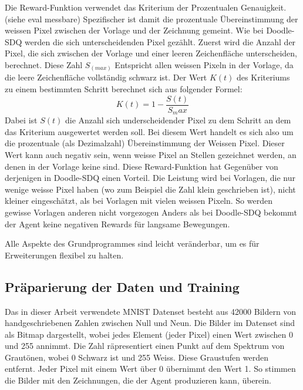 Die Reward-Funktion verwendet das Kriterium der Prozentualen Genauigkeit. (siehe eval messbare)
Spezifischer ist damit die prozentuale Übereinstimmung der weissen Pixel zwischen der Vorlage und der Zeichnung
gemeint. Wie bei Doodle-SDQ werden die sich unterscheidenden Pixel
gezählt. Zuerst wird die Anzahl der Pixel, die sich zwischen der Vorlage und
einer leeren Zeichenfläche unterscheiden, berechnet. Diese Zahl $S_(max)$
Entspricht allen weissen Pixeln in der Vorlage, da die leere Zeichenfläche
vollständig schwarz ist. Der Wert $K(t)$ des Kriteriums zu einem bestimmten
Schritt berechnet sich aus folgender Formel: 
$$ K(t) = 1 - \frac{S(t)}{S_max} $$ Dabei ist $S(t)$ die Anzahl sich
underscheidender Pixel zu dem Schritt an dem das Kriterium ausgewertet werden
soll. Bei diesem Wert handelt es sich also um die prozentuale (als Dezimalzahl)
Übereinstimmung der Weissen Pixel. Dieser Wert kann auch negativ sein, wenn
weisse Pixel an Stellen gezeichnet werden, an denen in der Vorlage keine sind.
Diese Reward-Funktion hat Gegenüber von derjenigen in Doodle-SDQ einen Vorteil. Die Leistung wird bei Vorlagen, die nur wenige
weisse Pixel haben (wo zum Beispiel die Zahl klein geschrieben ist), nicht
kleiner eingeschätzt, als bei Vorlagen mit vielen weissen Pixeln. So werden gewisse Vorlagen anderen nicht vorgezogen
Anders als bei Doodle-SDQ bekommt der Agent keine negativen
Rewards für langsame Bewegungen. 

Alle Aspekte des Grundprogrammes sind leicht veränderbar, um es für
Erweiterungen flexibel zu halten.

\subsection*{Präparierung der Daten und Training}
Das in dieser Arbeit verwendete MNIST Datenset besteht aus 42000 Bildern von
handgeschriebenen Zahlen zwischen Null und Neun. Die Bilder im Datenset sind als
Bitmap dargestellt, wobei jedes Element (jeder Pixel) einen Wert zwischen 0 und
255 annimmt. Die Zahl räpresentiert einen Punkt auf dem Spektrum von Grautönen,
wobei 0 Schwarz ist und 255 Weiss. Diese Graustufen werden entfernt. Jeder Pixel
mit einem Wert über 0 übernimmt den Wert 1. So stimmen die Bilder mit den
Zeichnungen, die der Agent produzieren kann, überein.

